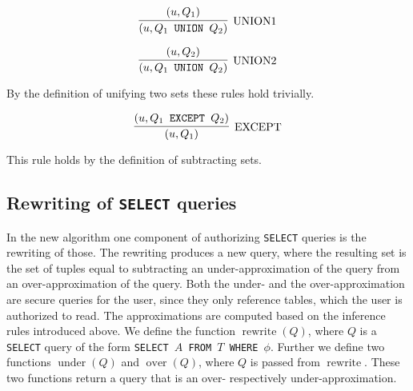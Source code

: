 \[
\infer[\text{UNION1}]
	{(u,Q_1 \text{\texttt{ UNION }} Q_2)}
	{(u,Q_1)}
\]

\[
\infer[\text{UNION2}]
	{(u,Q_1 \text{\texttt{ UNION }} Q_2)}
	{(u,Q_2)}
\]

By the definition of unifying two sets these rules hold trivially.

\[
\infer[\text{EXCEPT}]
	{(u,Q_1)}
	{(u,Q_1 \text{\texttt{ EXCEPT }} Q_2)}
\]

This rule holds by the definition of subtracting sets.

\subsection{Rewriting of \texttt{SELECT} queries}

In the new algorithm one component of authorizing \texttt{SELECT} queries is the rewriting of those.
%
The rewriting produces a new query, where the resulting set is the set of tuples equal to subtracting an under-approximation of the query from an over-approximation of the query.
%
Both the under- and the over-approximation are secure queries for the user, since they only reference tables, which the user is authorized to read.
%
The approximations are computed based on the inference rules introduced above.
%
We define the function $\operatorname{rewrite}(Q)$, where $Q$ is a \texttt{SELECT} query of the form \texttt{SELECT $A$ FROM $T$ WHERE $\phi$}.
%
Further we define two functions $\operatorname{under}(Q)$ and $\operatorname{over}(Q)$,  where $Q$ is passed from $\operatorname{rewrite}$.
%
These two functions return a query that is an over- respectively under-approximation.

